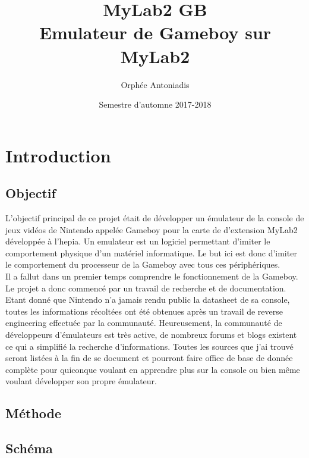 \documentclass[a4paper]{article}
\title{MyLab2 GB \protect\\ Emulateur de Gameboy sur MyLab2}
\author{Orphée Antoniadis}
\affil{\small Projet de semestre - Prof. Fabien Vannel}
\affil{\small Hepia ITI 3\up{ème} année}
\date{Semestre d'automne 2017-2018}
\begin{document}
\maketitle

\newpage
\setcounter{tocdepth}{3}
\tableofcontents
\newpage


\section{Introduction}
\subsection{Objectif}
L'objectif principal de ce projet était de développer un émulateur de la console
de jeux vidéos de Nintendo appelée Gameboy pour la carte de d'extension MyLab2
développée à l'hepia. Un emulateur est un logiciel permettant d'imiter le comportement
physique d'un matériel informatique. Le but ici est donc d'imiter le comportement
du processeur de la Gameboy avec tous ces périphériques. \\

Il a fallut dans un premier temps comprendre le fonctionnement de la Gameboy. 
Le projet a donc commencé par un travail de recherche et de documentation. Etant 
donné que Nintendo n'a jamais rendu public la datasheet de sa console, toutes les 
informations récoltées ont été obtenues après un travail de reverse engineering 
effectuée par la communauté. Heureusement, la communauté de développeurs d'émulateurs 
est très active, de nombreux forums et blogs existent ce qui a simplifié la recherche
d'informations. Toutes les sources que j'ai trouvé seront listées à la fin de se 
document et pourront faire office de base de donnée complète pour quiconque voulant 
en apprendre plus sur la console ou bien même voulant développer son propre émulateur.


\subsection{Méthode}


\subsection{Schéma}
\end{document}
